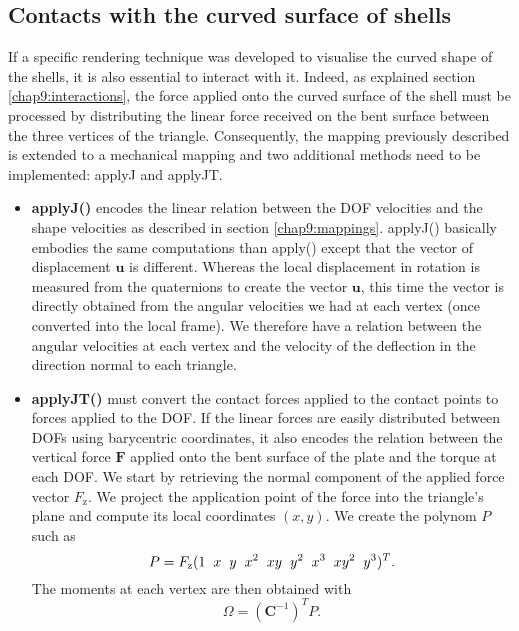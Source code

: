 	\subsection{Contacts with the curved surface of shells}
If a specific rendering technique was developed to visualise the curved shape of the shells, it is also essential to interact with it. Indeed, as explained section \ref{chap9:interactions}, the force applied onto the curved surface of the shell must be processed by distributing the linear force received on the bent surface between the three vertices of the triangle. Consequently, the mapping previously described is extended to a mechanical mapping and two additional methods need to be implemented: applyJ and applyJT. 
%
\begin{itemize}
\item \textbf{applyJ()} encodes the linear relation between the DOF velocities and the shape velocities as described in section \ref{chap9:mappings}. applyJ() basically embodies the same computations than apply() except that the vector of displacement $\mathbf{u}$ is different. Whereas the local displacement in rotation is measured from the quaternions to create the vector $\mathbf{u}$, this time the vector is directly obtained from the angular velocities we had at each vertex (once converted into the local frame). We therefore have a relation between the angular velocities at each vertex and the velocity of the deflection in the direction normal to each triangle. 
\item \textbf{applyJT()} must convert the contact forces applied to the contact points to forces applied to the DOF. If the linear forces are easily distributed between DOFs using barycentric coordinates, it also encodes the relation between the vertical force $ \mathbf{F} $ applied onto the bent surface of the plate and the torque at each DOF. We start by retrieving the normal component of the applied force vector $F_{\mathrm{z}}$. We project the application point of the force into the triangle's plane and compute its local coordinates $(x,y)$. We create the polynom $P$ such as 
%
\begin{equation}
P = F_{\mathrm{z}}(1 \hspace{0.2cm} x \hspace{0.2cm} y \hspace{0.2cm} x^2 \hspace{0.2cm} xy \hspace{0.2cm} y^2 \hspace{0.2cm} x^3 \hspace{0.2cm} xy^2 \hspace{0.2cm} y^3)^T. 
\end{equation}
%
The moments at each vertex are then obtained with 
\begin{equation}
\Omega = (\textbf{C}^{-1})^T P.
\end{equation}
\end{itemize}


